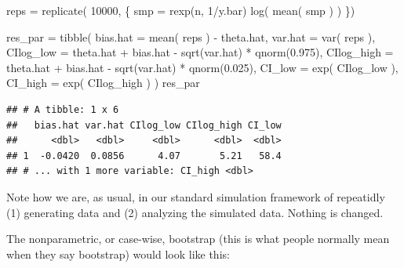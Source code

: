 \documentclass[
]{book}
\newenvironment{Shaded}{\begin{snugshade}}{\end{snugshade}}
\newcommand{\AttributeTok}[1]{\textcolor[rgb]{0.77,0.63,0.00}{#1}}
\newcommand{\DecValTok}[1]{\textcolor[rgb]{0.00,0.00,0.81}{#1}}
\newcommand{\FloatTok}[1]{\textcolor[rgb]{0.00,0.00,0.81}{#1}}
\newcommand{\FunctionTok}[1]{\textcolor[rgb]{0.00,0.00,0.00}{#1}}
\newcommand{\NormalTok}[1]{#1}
\newcommand{\OtherTok}[1]{\textcolor[rgb]{0.56,0.35,0.01}{#1}}
\newcommand{\SpecialCharTok}[1]{\textcolor[rgb]{0.00,0.00,0.00}{#1}}
\begin{document}
\begin{Shaded}
\begin{Highlighting}[]
\NormalTok{reps }\OtherTok{=} \FunctionTok{replicate}\NormalTok{( }\DecValTok{10000}\NormalTok{, \{}
\NormalTok{    smp }\OtherTok{=} \FunctionTok{rexp}\NormalTok{(n, }\DecValTok{1}\SpecialCharTok{/}\NormalTok{y.bar)}
    \FunctionTok{log}\NormalTok{( }\FunctionTok{mean}\NormalTok{( smp ) )}
\NormalTok{\})}

\NormalTok{res\_par }\OtherTok{=} \FunctionTok{tibble}\NormalTok{( }
  \AttributeTok{bias.hat =} \FunctionTok{mean}\NormalTok{( reps ) }\SpecialCharTok{{-}}\NormalTok{ theta.hat,}
  \AttributeTok{var.hat =} \FunctionTok{var}\NormalTok{( reps ),}
  \AttributeTok{CIlog\_low =}\NormalTok{ theta.hat }\SpecialCharTok{+}\NormalTok{ bias.hat }\SpecialCharTok{{-}} \FunctionTok{sqrt}\NormalTok{(var.hat) }\SpecialCharTok{*} \FunctionTok{qnorm}\NormalTok{(}\FloatTok{0.975}\NormalTok{),}
  \AttributeTok{CIlog\_high =}\NormalTok{ theta.hat }\SpecialCharTok{+}\NormalTok{ bias.hat }\SpecialCharTok{{-}} \FunctionTok{sqrt}\NormalTok{(var.hat) }\SpecialCharTok{*} \FunctionTok{qnorm}\NormalTok{(}\FloatTok{0.025}\NormalTok{),}
  \AttributeTok{CI\_low =} \FunctionTok{exp}\NormalTok{( CIlog\_low ),}
  \AttributeTok{CI\_high =} \FunctionTok{exp}\NormalTok{( CIlog\_high ) )}
\NormalTok{res\_par}
\end{Highlighting}
\end{Shaded}

\begin{verbatim}
## # A tibble: 1 x 6
##   bias.hat var.hat CIlog_low CIlog_high CI_low
##      <dbl>   <dbl>     <dbl>      <dbl>  <dbl>
## 1  -0.0420  0.0856      4.07       5.21   58.4
## # ... with 1 more variable: CI_high <dbl>
\end{verbatim}

Note how we are, as usual, in our standard simulation framework of repeatidly (1) generating data and (2) analyzing the simulated data.
Nothing is changed.

The nonparametric, or case-wise, bootstrap (this is what people normally mean when they say bootstrap) would look like this:
\end{document}
